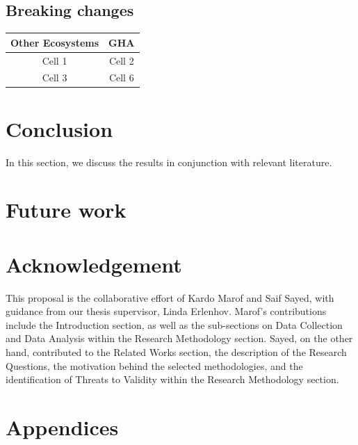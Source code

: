 \documentclass[conference]{IEEEtran}
\begin{document}
\subsection{Breaking changes}
\begin{tabular}{|c|c|}
  \hline
  \textbf{Other Ecosystems} & \textbf{GHA} \\
  \hline
  \hline
    Cell 1 & Cell 2  \\
  \hline
   Cell 3& Cell 6 \\
  \hline
\end{tabular}

\section{Conclusion}
	
In this section, we discuss the results in conjunction with relevant literature.

\section{Future work}

\section{Acknowledgement}

         This proposal is the collaborative effort of Kardo Marof and Saif Sayed, with guidance from our thesis supervisor, Linda Erlenhov. Marof's contributions include the Introduction section, as well as the sub-sections on Data Collection and Data Analysis within the Research Methodology section. Sayed, on the other hand, contributed to the Related Works section, the description of the Research Questions, the motivation behind the selected methodologies, and the identification of Threats to Validity within the Research Methodology section.


\section{Appendices}




\vspace{12pt}
\end{document}
